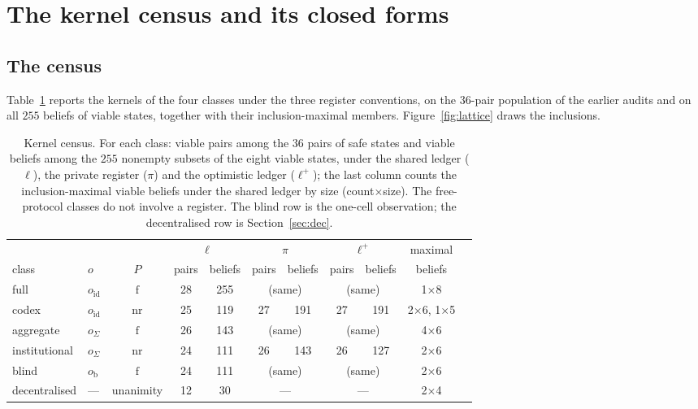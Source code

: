 \documentclass[11pt,a4paper]{article}
\theoremstyle{plain}
\theoremstyle{definition}
\theoremstyle{remark}
\newcommand{\led}{\ell}
\newcommand{\priv}{\pi}
\newcommand{\opt}{\ell^{+}}
\newcommand{\free}{\mathrm{f}}
\newcommand{\nr}{\mathrm{nr}}
\newcommand{\ofull}{o_{\mathrm{id}}}
\newcommand{\oagg}{o_{\Sigma}}
\newcommand{\oblind}{o_{\mathrm{b}}}
\begin{document}
\section{The kernel census and its closed forms}\label{sec:census}

\subsection{The census}\label{sec:census_numbers}

Table~\ref{tab:kernels} reports the kernels of the four classes under the three register conventions, on the $36$-pair population of the earlier audits and on all $255$ beliefs of viable states, together with their inclusion-maximal members. Figure~\ref{fig:lattice} draws the inclusions.

\begin{table}[t]
\centering\small
\caption{Kernel census. For each class: viable pairs among the $36$ pairs of safe states and viable beliefs among the $255$ nonempty subsets of the eight viable states, under the shared ledger ($\led$), the private register ($\priv$) and the optimistic ledger ($\opt$); the last column counts the inclusion-maximal viable beliefs under the shared ledger by size (count$\times$size). The free-protocol classes do not involve a register. The blind row is the one-cell observation; the decentralised row is Section~\ref{sec:dec}.}
\label{tab:kernels}
\begin{tabular}{llccccccccl}
\toprule
 & & & \multicolumn{2}{c}{$\led$} & \multicolumn{2}{c}{$\priv$} & \multicolumn{2}{c}{$\opt$} & maximal \\
\cmidrule(lr){4-5}\cmidrule(lr){6-7}\cmidrule(lr){8-9}
class & $o$ & $P$ & pairs & beliefs & pairs & beliefs & pairs & beliefs & beliefs \\
\midrule
full & $\ofull$ & $\free$ & 28 & 255 & \multicolumn{2}{c}{(same)} & \multicolumn{2}{c}{(same)} & 1$\times$8 \\
codex & $\ofull$ & $\nr$ & 25 & 119 & 27 & 191 & 27 & 191 & 2$\times$6, 1$\times$5 \\
aggregate & $\oagg$ & $\free$ & 26 & 143 & \multicolumn{2}{c}{(same)} & \multicolumn{2}{c}{(same)} & 4$\times$6 \\
institutional & $\oagg$ & $\nr$ & 24 & 111 & 26 & 143 & 26 & 127 & 2$\times$6 \\
blind & $\oblind$ & $\free$ & 24 & 111 & \multicolumn{2}{c}{(same)} & \multicolumn{2}{c}{(same)} & 2$\times$6 \\
decentralised & --- & unanimity & 12 & 30 & \multicolumn{2}{c}{---} & \multicolumn{2}{c}{---} & 2$\times$4 \\
\bottomrule
\end{tabular}
\end{table}
\end{document}
